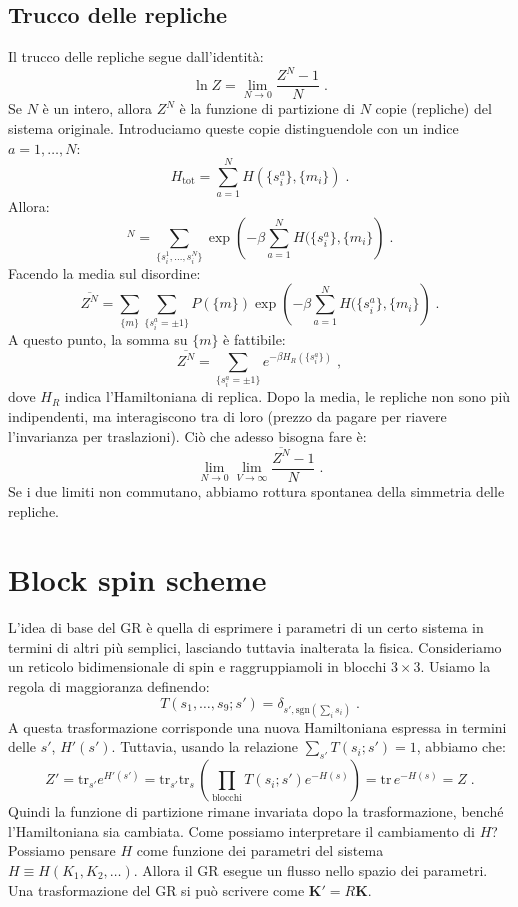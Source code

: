 \documentclass[10pt,a4paper]{report}
\theoremstyle{definition}
\numberwithin{equation}{section}
\newcommand{\tr}{\mathrm{tr}}
\begin{document}
\subsection{Trucco delle repliche}
Il trucco delle repliche segue dall'identità:
$$
\ln Z=\lim_{N\to 0}\frac{Z^N-1}{N}\;.
$$
Se $N$ è un intero, allora $Z^N$ è la funzione di partizione di $N$ copie (repliche) del sistema originale. Introduciamo queste copie distinguendole con un indice $a=1,\ldots,N$:
\begin{equation}
H_{\mathrm{tot}}=\sum_{a=1}^NH(\{s_i^a\},\{m_i\})\;.
\end{equation}
Allora:
\begin{equation}
[Z(\{m\})]^N=\sum_{\{s_i^1,\ldots,s_i^N\}}\exp\left(-\beta \sum_{a=1}^N H(\{s_i^a\},\{m_i\}\right)\;.
\end{equation}
Facendo la media sul disordine:
\begin{equation}
\overline{Z^N}=\sum_{\{m\}}\sum_{\{s_i^a=\pm 1\}}P(\{m\})\exp\left(-\beta\sum_{a=1}^NH(\{s_i^a\},\{m_i\}\right)\;.
\end{equation}
A questo punto, la somma su $\{m\}$ è fattibile:
\begin{equation}
\overline{Z^N}=\sum_{\{s_i^a=\pm 1\}}e^{-\beta H_R(\{s_i^a\})}\;,
\end{equation}
dove $H_R$ indica l'Hamiltoniana di replica. Dopo la media, le repliche non sono più indipendenti, ma interagiscono tra di loro (prezzo da pagare per riavere l'invarianza per traslazioni). Ciò che adesso bisogna fare è:
\begin{equation}
\lim_{N\to 0}\lim_{V\to\infty}\frac{\overline{Z^N}-1}{N}\;.
\end{equation}
Se i due limiti non commutano, abbiamo rottura spontanea della simmetria delle repliche.
\section{Block spin scheme}
L'idea di base del GR è quella di esprimere i parametri di un certo sistema in termini di altri più semplici, lasciando tuttavia inalterata la fisica. Consideriamo un reticolo bidimensionale di spin e raggruppiamoli in blocchi $3\times 3$. Usiamo la regola di maggioranza definendo:
\begin{equation}
T(s_1,\ldots, s_9;s')=\delta_{s',\mathrm{sgn}(\sum_is_i)}\;.
\end{equation}
A questa trasformazione corrisponde una nuova Hamiltoniana espressa in termini delle $s'$, $H'(s')$. Tuttavia, usando la relazione $\sum_{s'}T(s_i;s')=1$, abbiamo che:
\begin{equation}
Z'=\tr_{s'}e^{H'(s')}=\tr_{s'}\tr_s\,\left(\prod_{\mathrm{blocchi}}T(s_i;s')e^{-H(s)}\right)=\tr\, e^{-H(s)}=Z\;.
\end{equation}
Quindi la funzione di partizione rimane invariata dopo la trasformazione, benché l'Hamiltoniana sia cambiata. Come possiamo interpretare il cambiamento di $H$? Possiamo pensare $H$ come funzione dei parametri del sistema $H\equiv H(K_1,K_2,\ldots)$. Allora il GR esegue un flusso nello spazio dei parametri. Una trasformazione del GR si può scrivere come $\mathbf{K}'=R\mathbf{K}$.
\end{document}
